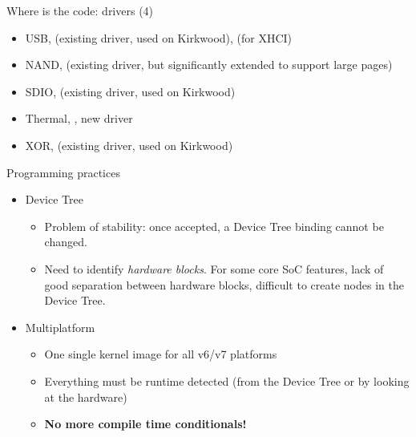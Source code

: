 \begin{frame}{Where is the code: drivers (4)}

\begin{itemize}
\item USB,  (existing driver, used
  on Kirkwood),  (for XHCI)
\item NAND,  (existing driver,
  but significantly extended to support large pages)
\item SDIO,  (existing driver, used on
  Kirkwood)
\item Thermal, , new driver
\item XOR,  (existing driver, used on
  Kirkwood)
\end{itemize}

\end{frame}

\begin{frame}{Programming practices}
  \begin{itemize}
  \item Device Tree
    \begin{itemize}
    \item Problem of stability: once accepted, a Device Tree binding
      cannot be changed.
    \item Need to identify {\em hardware blocks}. For some core SoC
      features, lack of good separation between hardware blocks, difficult
      to create nodes in the Device Tree.
    \end{itemize}
  \item Multiplatform
    \begin{itemize}
    \item One single kernel image for all v6/v7 platforms
    \item Everything must be runtime detected (from the Device Tree or by
      looking at the hardware)
    \item {\bf No more compile time conditionals!}
    \end{itemize}
  \end{itemize}
\end{frame}